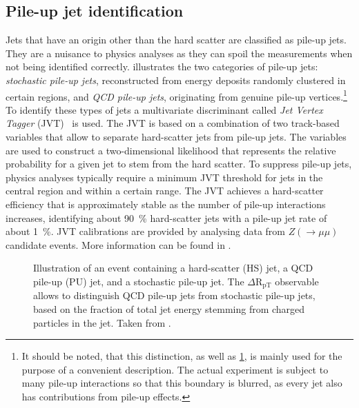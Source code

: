 \subsection{Pile-up jet identification}
Jets that have an origin other than the hard scatter are classified as pile-up jets.
They are a nuisance to physics analyses as they can spoil the measurements when not being identified correctly.
 illustrates the two categories of pile-up jets:
\emph{stochastic pile-up jets}, reconstructed from energy deposits randomly clustered in certain regions, and \emph{QCD pile-up jets}, originating from genuine pile-up vertices.\footnote{It should be noted, that this distinction, as well as \cref{fig:pile-up-jets-illustration}, is mainly used for the purpose of a convenient description. The actual experiment is subject to many pile-up interactions so that this boundary is blurred, as every jet also has contributions from pile-up effects.}
To identify these types of jets a multivariate discriminant called \emph{Jet Vertex Tagger} (JVT)~\cite{ATLAS-CONF-2014-018} is used.
The JVT is based on a combination of two track-based variables that allow to separate hard-scatter jets from pile-up jets. The variables are used to construct a two-dimensional likelihood that represents the relative probability for a given jet to stem from the hard scatter.
To suppress pile-up jets, physics analyses typically require a minimum JVT threshold for jets in the central region  and within a certain \pT range.
The JVT achieves a hard-scatter efficiency that is approximately stable as the number of pile-up interactions increases, identifying about \SI{90}{\percent} hard-scatter jets with a pile-up jet rate of about \SI{1}{\percent}.
JVT calibrations are provided by analysing data from $Z (\rightarrow \mu\mu)$ candidate events.
More information can be found in .

\FloatBarrier
\begin{figure}[t]
    \caption{Illustration of an event containing a hard-scatter (HS) jet, a QCD pile-up (PU) jet, and a stochastic pile-up jet. The $\Delta \text{R}_{\text{pT}}$ observable allows to distinguish QCD pile-up jets from stochastic pile-up jets, based on the fraction of total jet energy stemming from charged particles in the jet. Taken from .}
    \label{fig:pile-up-jets-illustration}
\end{figure}


